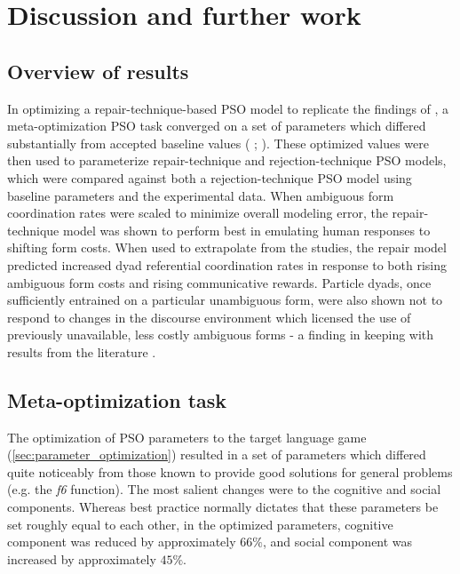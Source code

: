 \documentclass[12pt,a4paper]{article}
\begin{document}
\section{Discussion and further work}
\subsection{Overview of results}
In optimizing a repair-technique-based PSO model to replicate the findings of \citeauthor{rohde2012}, a meta-optimization PSO task converged on a set of parameters which differed substantially from accepted baseline values (\citeauthor{shi1998} \citeyear{shi1998}; \citeauthor{solnon2010} \citeyear{solnon2010}). These optimized values were then used to parameterize repair-technique and rejection-technique PSO models, which were compared against both a rejection-technique PSO model using baseline parameters and the experimental data. When ambiguous form coordination rates were scaled to minimize overall modeling error, the repair-technique model was shown to perform best in emulating human responses to shifting form costs. When used to extrapolate from the \citeauthor{rohde2012} studies, the repair model predicted increased dyad referential coordination rates in response to both rising ambiguous form costs and rising communicative rewards. Particle dyads, once sufficiently entrained on a particular unambiguous form, were also shown not to respond to changes in the discourse environment which licensed the use of previously unavailable, less costly ambiguous forms - a finding in keeping with results from the literature \citep{brennan1996}.

\subsection{Meta-optimization task}
The optimization of PSO parameters to the target language game (\ref{sec:parameter_optimization}) resulted in a set of parameters which differed quite noticeably from those known to provide good solutions for general problems (e.g. the \textit{f6} function). The most salient changes were to the cognitive and social components. Whereas best practice normally dictates that these parameters be set roughly equal to each other, in the optimized parameters, cognitive component was reduced by approximately $66\%$, and social component was increased by approximately $45\%$. 
\end{document}
